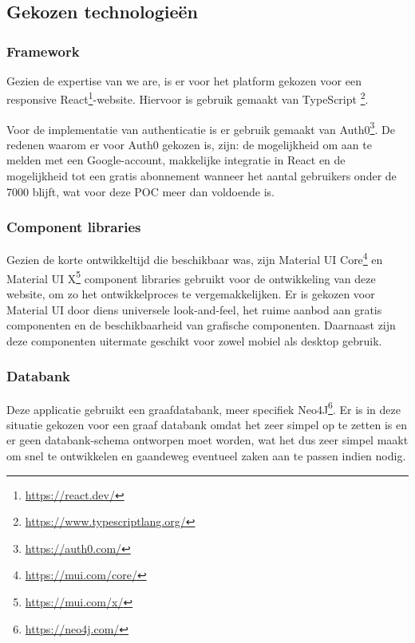 \chapter{}%
\label{ch:proofofconcept}

\section{Gekozen technologieën}

\subsection{Framework}

Gezien de expertise van we are, is er voor het platform gekozen voor een responsive React\footnote{\href{https://react.dev/}{https://react.dev/}}-website. Hiervoor is gebruik gemaakt van TypeScript \footnote{\href{https://www.typescriptlang.org/}{https://www.typescriptlang.org/}}.

Voor de implementatie van authenticatie is er gebruik gemaakt van Auth0\footnote{\href{https://auth0.com/}{https://auth0.com/}}. De redenen waarom er voor Auth0 gekozen is, zijn: de mogelijkheid om aan te melden met een Google-account, makkelijke integratie in React en de mogelijkheid tot een gratis abonnement wanneer het aantal gebruikers onder de 7000 blijft, wat voor deze POC meer dan voldoende is.

\subsection{Component libraries}
Gezien de korte ontwikkeltijd die beschikbaar was, zijn Material UI Core\footnote{\href{https://mui.com/core/}{https://mui.com/core/}} en Material UI X\footnote{\href{https://mui.com/x/}{https://mui.com/x/}} component libraries gebruikt voor de ontwikkeling van deze website, om zo het ontwikkelproces te vergemakkelijken. Er is gekozen voor Material UI door diens universele look-and-feel, het ruime aanbod aan gratis componenten en de beschikbaarheid van grafische componenten. Daarnaast zijn deze componenten uitermate geschikt voor zowel mobiel als desktop gebruik.

\subsection{Databank}

Deze applicatie gebruikt een graafdatabank, meer specifiek Neo4J\footnote{\href{https://neo4j.com/}{https://neo4j.com/}}. Er is in deze situatie gekozen voor een graaf databank omdat het zeer simpel op te zetten is en er geen databank-schema ontworpen moet worden, wat het dus zeer simpel maakt om snel te ontwikkelen en gaandeweg eventueel zaken aan te passen indien nodig.

